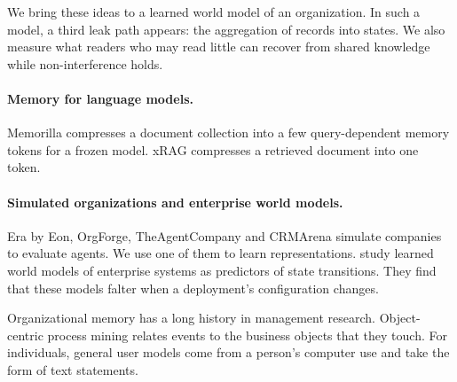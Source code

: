 \documentclass[11pt]{article}
\begin{document}
We bring these ideas to a learned world model of an organization. In such a model, a third leak path appears: the aggregation of records into states. We also measure what readers who may read little can recover from shared knowledge while non-interference holds.

\paragraph{Memory for language models.} Memorilla compresses a document collection into a few query-dependent memory tokens for a frozen model\citep{fallahpour2026memorilla}. xRAG compresses a retrieved document into one token\citep{cheng2024xrag}.

\paragraph{Simulated organizations and enterprise world models.} Era by Eon\citep{gruenbaum2026era}, OrgForge\citep{flynt2026orgforge}, TheAgentCompany\citep{xu2024theagentcompany} and CRMArena\citep{huang2024crmarena} simulate companies to evaluate agents. We use one of them to learn representations. \citet{nair2026enterprise} study learned world models of enterprise systems as predictors of state transitions. They find that these models falter when a deployment's configuration changes.

Organizational memory has a long history in management research\citep{walsh1991organizational}. Object-centric process mining relates events to the business objects that they touch\citep{vanderaalst2019object}. For individuals, general user models come from a person's computer use and take the form of text statements\citep{shaikh2025gum}.
\end{document}
